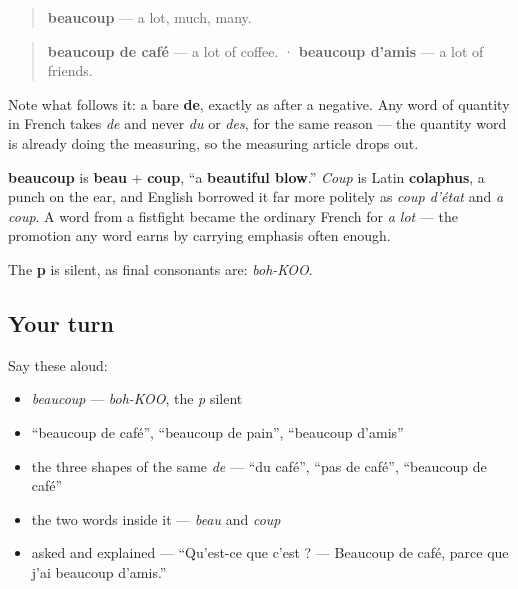 \begin{cousinweb}
\begin{quote}
\textbf{beaucoup} — a lot, much, many.
\end{quote}

\begin{quote}
\textbf{beaucoup de café} — a lot of coffee. · \textbf{beaucoup d'amis} — a lot of friends.
\end{quote}

Note what follows it: a bare \textbf{de}, exactly as after a negative. Any word of quantity in French takes \emph{de} and never \emph{du} or \emph{des}, for the same reason — the quantity word is already doing the measuring, so the measuring article drops out.

\textbf{beaucoup} is \textbf{beau} + \textbf{coup}, \textquotedblleft{}a \textbf{beautiful blow}.\textquotedblright{} \emph{Coup} is Latin \textbf{colaphus}, a punch on the ear, and English borrowed it far more politely as \emph{coup d'état} and \emph{a coup}. A word from a fistfight became the ordinary French for \emph{a lot} — the promotion any word earns by carrying emphasis often enough.

The \textbf{p} is silent, as final consonants are: \emph{boh-KOO}.
\end{cousinweb}

\subsection*{Your turn}
Say these aloud:

\begin{itemize}
\raggedright
  \item \emph{beaucoup} — \emph{boh-KOO}, the \emph{p} silent
  \item \textquotedblleft{}beaucoup de café\textquotedblright{}, \textquotedblleft{}beaucoup de pain\textquotedblright{}, \textquotedblleft{}beaucoup d'amis\textquotedblright{}
  \item the three shapes of the same \emph{de} — \textquotedblleft{}du café\textquotedblright{}, \textquotedblleft{}pas de café\textquotedblright{}, \textquotedblleft{}beaucoup de café\textquotedblright{}
  \item the two words inside it — \emph{beau} and \emph{coup}
  \item asked and explained — \textquotedblleft{}Qu'est-ce que c'est ? — Beaucoup de café, parce que j'ai beaucoup d'amis.\textquotedblright{}
\end{itemize}

